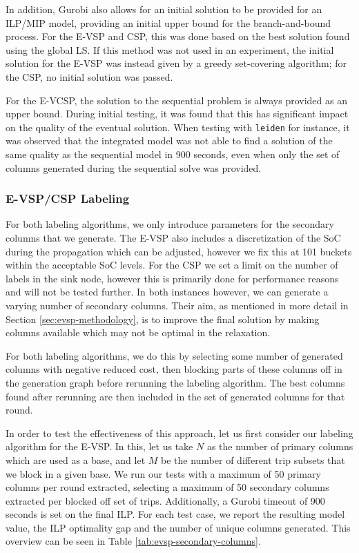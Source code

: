 \documentclass[]{article}
\begin{document}
\noindent In addition, Gurobi also allows for an initial solution to be provided for an ILP/MIP model, providing an initial upper bound for the branch-and-bound process. For the E-VSP and CSP, this was done based on the best solution found using the global LS. If this method was not used in an experiment, the initial solution for the E-VSP was instead given by a greedy set-covering algorithm; for the CSP, no initial solution was passed. 

For the E-VCSP, the solution to the sequential problem is always provided as an upper bound. During initial testing, it was found that this has significant impact on the quality of the eventual solution. When testing with \texttt{leiden} for instance, it was observed that the integrated model was not able to find a solution of the same quality as the sequential model in 900 seconds, even when only the set of columns generated during the sequential solve was provided.

\subsubsection{E-VSP/CSP Labeling} \label{sec:params-sec-label-columns}
For both labeling algorithms, we only introduce parameters for the secondary columns that we generate. The E-VSP also includes a discretization of the SoC during the propagation which can be adjusted, however we fix this at 101 buckets within the acceptable SoC levels. For the CSP we set a limit on the number of labels in the sink node, however this is primarily done for performance reasons and will not be tested further. In both instances however, we can generate a varying number of secondary columns. Their aim, as mentioned in more detail in Section \ref{sec:evsp-methodology}, is to improve the final solution by making columns available which may not be optimal in the relaxation. 

For both labeling algorithms, we do this by selecting some number of generated columns with negative reduced cost, then blocking parts of these columns off in the generation graph before rerunning the labeling algorithm. The best columns found after rerunning are then included in the set of generated columns for that round.

In order to test the effectiveness of this approach, let us first consider our labeling algorithm for the E-VSP. In this, let us take $N$ as the number of primary columns which are used as a base, and let $M$ be the number of different trip subsets that we block in a given base. We run our tests with a maximum of 50 primary columns per round extracted, selecting a maximum of 50 secondary columns extracted per blocked off set of trips. Additionally, a Gurobi timeout of 900 seconds is set on the final ILP. For each test case, we report the resulting model value, the ILP optimality gap and the number of unique columns generated. This overview can be seen in Table \ref{tab:evsp-secondary-columns}. 
\end{document}
